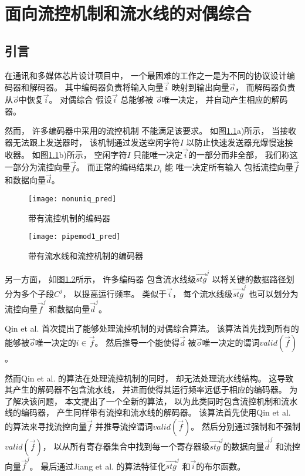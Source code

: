 \chapter{面向流控机制和流水线的对偶综合}
\label{chap:6}

\section{引言}\label{sec_intro}
在通讯和多媒体芯片设计项目中，
一个最困难的工作之一是为不同的协议设计编码器和解码器。
其中编码器负责将输入向量$\vec{i}$ 映射到输出向量$\vec{o}$，
而解码器负责从$\vec{o}$中恢复$\vec{i}$。
对偶综合
假设$\vec{i}$ 总能够被 $\vec{o}$唯一决定，
并自动产生相应的解码器。

然而，
许多编码器中采用的流控机制
不能满足该要求。
如图\ref{fig_fc}a)所示，
当接收器无法跟上发送器时，
该机制通过发送空闲字符$I$ 以防止快速发送器充爆慢速接收器。
如图\ref{fig_fc}b)所示，
空闲字符$I$
只能唯一决定$\vec{i}$的一部分而非全部，
我们称这一部分为流控向量$\vec{f}$。
而正常的编码结果$D_i$ 能
唯一决定所有输入
包括流控向量$\vec{f}$ 和数据向量$\vec{d}$。


\begin{figure}[t]
\centering
\texttt{[image: nonuniq\_pred]}
\caption{带有流控机制的编码器}
\label{fig_fc}
\end{figure}

\begin{figure}[b]
\centering
\texttt{[image: pipemod1\_pred]}
\caption{带有流水线和流控机制的编码器}
\label{fig_pipeenc}
\end{figure}



另一方面，
如图\ref{fig_pipeenc}所示，
许多编码器
包含流水线级$\vec{stg}^j$ 以将关键的数据路径划分为多个子段$C^j$，
以提高运行频率。
类似于$\vec{i}$，
每个流水线级$\vec{stg}^j$ 也可以划分为流控向量$\vec{f}^j$ 和数据向量$\vec{d}^j$。

Qin et al.  首次提出了能够处理流控机制的对偶综合算法。
该算法首先找到所有的能够被$\vec{o}$唯一决定的$i\in\vec{f}$。
然后推导一个能使得$\vec{d}$ 被$\vec{o}$唯一决定的谓词$valid(\vec{f})$。

然而Qin et al. 的算法在处理流控机制的同时，
却无法处理流水线结构。
这导致其产生的解码器不包含流水线，
并进而使得其运行频率远低于相应的编码器。
为了解决该问题，
本文提出了一个全新的算法，
以为此类同时包含流控机制和流水线的编码器，
产生同样带有流控和流水线的解码器。
该算法首先使用Qin et al. 的算法来寻找流控向量$\vec{f}$ 并推导流控谓词$valid(\vec{f})$。
然后分别通过强制和不强制$valid(\vec{f})$，
以从所有寄存器集合中找到每一个寄存器级$\vec{stg}^j$的数据向量$\vec{d}^j$ 和流控向量$\vec{f}^j$。
最后通过Jiang et al. 的算法特征化$\vec{stg}^j$ 和$\vec{i}$的布尔函数。

